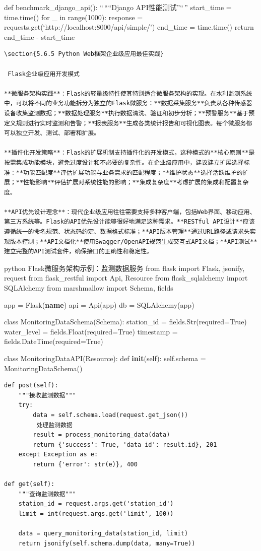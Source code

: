 def benchmark\_django\_api(): ``\,````Django API性能测试''``\,'' start\_time = time.time() for \_ in range(1000): response = requests.get(`http://localhost:8000/api/simple/') end\_time = time.time() return end\_time - start\_time

\begin{lstlisting}
\section{5.6.5 Python Web框架企业级应用最佳实践}

 Flask企业级应用开发模式

**微服务架构实践**：Flask的轻量级特性使其特别适合微服务架构的实现。在水利监测系统中，可以将不同的业务功能拆分为独立的Flask微服务：**数据采集服务**负责从各种传感器设备收集监测数据；**数据处理服务**执行数据清洗、验证和初步分析；**预警服务**基于预定义规则进行实时监测和告警；**报表服务**生成各类统计报告和可视化图表。每个微服务都可以独立开发、测试、部署和扩展。

**插件化开发策略**：Flask的扩展机制支持插件化的开发模式，这种模式的**核心原则**是按需集成功能模块，避免过度设计和不必要的复杂性。在企业级应用中，建议建立扩展选择标准：**功能匹配度**评估扩展功能与业务需求的匹配程度；**维护状态**选择活跃维护的扩展；**性能影响**评估扩展对系统性能的影响；**集成复杂度**考虑扩展的集成和配置复杂度。

**API优先设计理念**：现代企业级应用往往需要支持多种客户端，包括Web界面、移动应用、第三方系统等。Flask的API优先设计能够很好地满足这种需求。**RESTful API设计**应该遵循统一的命名规范、状态码约定、数据格式标准；**API版本管理**通过URL路径或请求头实现版本控制；**API文档化**使用Swagger/OpenAPI规范生成交互式API文档；**API测试**建立完整的API测试套件，确保接口的正确性和稳定性。
\end{lstlisting}

python  Flask微服务架构示例：监测数据服务 from flask import Flask, jsonify, request from flask\_restful import Api, Resource from flask\_sqlalchemy import SQLAlchemy from marshmallow import Schema, fields

app = Flask(\textbf{name}) api = Api(app) db = SQLAlchemy(app)

class MonitoringDataSchema(Schema): station\_id = fields.Str(required=True) water\_level = fields.Float(required=True) timestamp = fields.DateTime(required=True)

class MonitoringDataAPI(Resource): def \textbf{init}(self): self.schema = MonitoringDataSchema()

\begin{verbatim}
def post(self):
    """接收监测数据"""
    try:
        data = self.schema.load(request.get_json())
         处理监测数据
        result = process_monitoring_data(data)
        return {'success': True, 'data_id': result.id}, 201
    except Exception as e:
        return {'error': str(e)}, 400

def get(self):
    """查询监测数据"""
    station_id = request.args.get('station_id')
    limit = int(request.args.get('limit', 100))
    
    data = query_monitoring_data(station_id, limit)
    return jsonify(self.schema.dump(data, many=True))
\end{verbatim}


